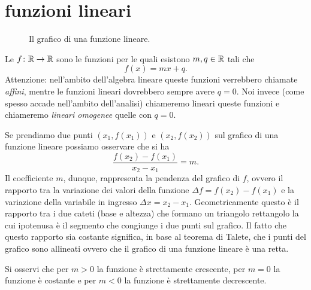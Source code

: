 \section{funzioni lineari}

\begin{figure}
  \begin{center}
  \end{center}
  \caption{Il grafico di una funzione lineare.}
  \label{fig:funzione_lineare}
\end{figure}

Le 
$f\colon \mathbb R \to \mathbb R$ sono le funzioni per le quali
esistono $m,q\in\mathbb R$ tali che
\[
  f(x) = mx + q.
\]
Attenzione: nell'ambito dell'algebra lineare queste
funzioni verrebbero chiamate \emph{affini}, mentre
le funzioni lineari dovrebbero sempre avere $q=0$.
Noi invece (come spesso accade nell'ambito dell'analisi)
chiameremo lineari queste funzioni e chiameremo
\emph{lineari omogenee} quelle con $q=0$.

Se prendiamo due punti $(x_1,f(x_1))$
e $(x_2,f(x_2))$ sul grafico di una funzione lineare
possiamo osservare che si ha
\[
  \frac{f(x_2) - f(x_1)}{x_2 - x_1} = m.
\]
Il coefficiente $m$, dunque, rappresenta la pendenza del
grafico di $f$, ovvero il rapporto tra la variazione
dei valori della funzione $\Delta f = f(x_2) - f(x_1)$
e la variazione della variabile in ingresso
$\Delta x = x_2 - x_1$.
Geometricamente questo è il rapporto tra i due cateti
(base e altezza) che formano un triangolo rettangolo la
cui ipotenusa è il segmento che congiunge i due punti sul grafico.
Il fatto che questo rapporto sia costante significa,
in base al teorema di Talete, che i punti del grafico sono
allineati ovvero che il grafico di una funzione lineare è una retta.

Si osservi che per $m>0$ la funzione è strettamente crescente,
per $m=0$ la funzione è costante e per $m<0$ la funzione è
strettamente decrescente.

